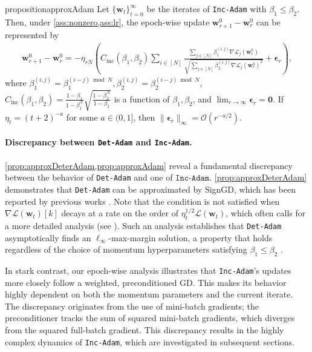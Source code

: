 \documentclass{article} %
\theoremstyle{plain}
\theoremstyle{definition}
\theoremstyle{remark}
\def\bigopen#1{\left(#1\right)}
\newcommand{\Ls}{\mathcal{L}}
\def\bw{{\mathbf w}}
\begin{document}
\begin{restatable}{proposition}{approxAdam}\label{prop:approxAdam}
    Let $\{\bw_t\}_{t=0}^\infty$ be the iterates of \textnormal{\texttt{Inc-Adam}} with $\beta_1 \leq \beta_2$. Then, under \cref{ass:nonzero,ass:lr}, the epoch-wise update $\bw_{r+1}^0-\bw_{r}^0$ can be represented by
    \begin{align}\label{eq:approxIncAdam}
        \bw_{r+1}^0-\bw_{r}^0 = -\eta_{rN}\bigopen{C_{\text{inc}}(\beta_1, \beta_2)\sum_{i \in [N]}\frac{\sum_{j \in [N]}\beta_1^{(i, j)}\nabla\Ls_{j}(\bw_r^0)}{\sqrt{\sum_{j \in [N]}\beta_2^{(i, j)}\nabla\Ls_{j}(\bw_r^0)^2}} + \boldsymbol{\epsilon}_r},
    \end{align}
    where $\beta_1^{(i, j)} = \beta_1^{(i-j)\bmod N}, \beta_2^{(i, j)} = \beta_2^{(i-j)\bmod N}$, $C_{\text{inc}}(\beta_1, \beta_2)=\frac{1-\beta_1}{1-\beta_1^N}\sqrt{\frac{1-\beta_2^N}{1-\beta_2}}$ is a function of $\beta_1, \beta_2$, and $\lim_{r\rightarrow \infty} 
    \boldsymbol{\epsilon}_r = \mathbf{0}$. If $\eta_t = (t+2)^{-a}$ for some $a \in (0, 1]$, then $\|\boldsymbol{\epsilon}_r\|_\infty = \mathcal{O}(r^{-a/2})$.
\end{restatable}

\vspace{-3pt}
\paragraph{Discrepancy between \texttt{Det-Adam} and \texttt{Inc-Adam}.} \cref{prop:approxDeterAdam,prop:approxAdam} reveal a fundamental discrepancy between the behavior of \texttt{Det-Adam} and one of $\texttt{Inc-Adam}$. \cref{prop:approxDeterAdam} demonstrates that \texttt{Det-Adam} can be approximated by SignGD, which has been reported by previous works \citep{balles2018dissecting,zou2023understanding}. Note that the condition is not satisfied when $\nabla \Ls(\bw_t)[k]$ decays at a rate on the order of $\eta_t^{1/2} \Ls(\bw_t)$, which often calls for a more detailed analysis (see \citet[Lemma 6.2]{zhang2024the}). Such an analysis establishes that \texttt{Det-Adam} asymptotically finds an $\ell_\infty$-max-margin solution, a property that holds regardless of the choice of momentum hyperparameters satisfying $\beta_1 \leq \beta_2$ \citep{zhang2024the}.

In stark contrast, our epoch-wise analysis illustrates that \texttt{Inc-Adam}'s updates more closely follow a weighted, preconditioned GD. This makes its behavior highly dependent on both the momentum parameters and the current iterate. The discrepancy originates from the use of mini-batch gradients; the preconditioner tracks the sum of squared mini-batch gradients, which diverges from the squared full-batch gradient. This discrepancy results in the highly complex dynamics of \texttt{Inc-Adam}, which are investigated in subsequent sections.
\end{document}
